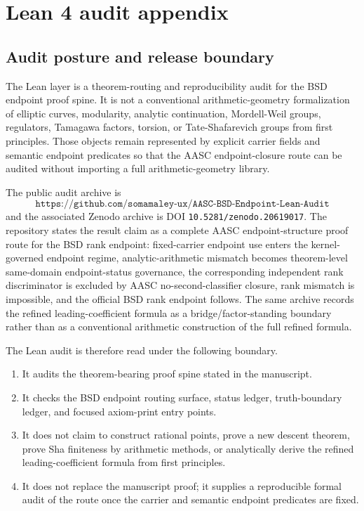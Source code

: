 \documentclass[11pt]{article}
\begin{document}
\section{Lean 4 audit appendix}

\subsection{Audit posture and release boundary}
The Lean layer is a theorem-routing and reproducibility audit for the BSD endpoint proof spine. It is not a conventional arithmetic-geometry formalization of elliptic curves, modularity, analytic continuation, Mordell-Weil groups, regulators, Tamagawa factors, torsion, or Tate-Shafarevich groups from first principles. Those objects remain represented by explicit carrier fields and semantic endpoint predicates so that the AASC endpoint-closure route can be audited without importing a full arithmetic-geometry library.

The public audit archive is
\[
\texttt{https://github.com/somamaley-ux/AASC-BSD-Endpoint-Lean-Audit}
\]
and the associated Zenodo archive is DOI \texttt{10.5281/zenodo.20619017}. The repository states the result claim as a complete AASC endpoint-structure proof route for the BSD rank endpoint: fixed-carrier endpoint use enters the kernel-governed endpoint regime, analytic-arithmetic mismatch becomes theorem-level same-domain endpoint-status governance, the corresponding independent rank discriminator is excluded by AASC no-second-classifier closure, rank mismatch is impossible, and the official BSD rank endpoint follows. The same archive records the refined leading-coefficient formula as a bridge/factor-standing boundary rather than as a conventional arithmetic construction of the full refined formula.

The Lean audit is therefore read under the following boundary.
\begin{enumerate}
\item It audits the theorem-bearing proof spine stated in the manuscript.
\item It checks the BSD endpoint routing surface, status ledger, truth-boundary ledger, and focused axiom-print entry points.
\item It does not claim to construct rational points, prove a new descent theorem, prove Sha finiteness by arithmetic methods, or analytically derive the refined leading-coefficient formula from first principles.
\item It does not replace the manuscript proof; it supplies a reproducible formal audit of the route once the carrier and semantic endpoint predicates are fixed.
\end{enumerate}
\end{document}
